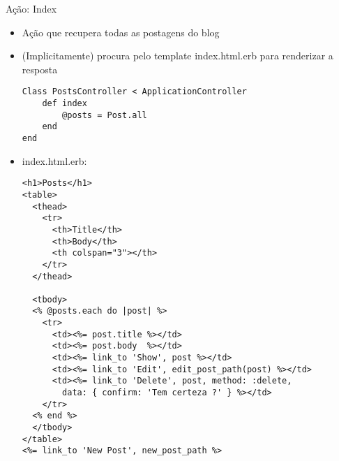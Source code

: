 \begin{frame}{Ação: Index}
	\begin{itemize}
		\item Ação que recupera \alert{todas as postagens} do blog
		\item (Implicitamente) procura pelo template \alert{index.html.erb} para renderizar a resposta
		\begin{lstlisting}[style=RubyInputStyle, caption=controllers/posts\_controller.rb]
Class PostsController < ApplicationController
	def index
		@posts = Post.all
	end
end 
		\end{lstlisting}		
		\framebreak
		\item \alert{index.html.erb}:
		\begin{lstlisting}[style=RubyInputStyle, caption=views/posts/index.html.erb]
<h1>Posts</h1>
<table>
  <thead>
    <tr>
      <th>Title</th>
      <th>Body</th>
      <th colspan="3"></th>
    </tr>
  </thead>

  <tbody>
  <% @posts.each do |post| %>
    <tr>
      <td><%= post.title %></td>
      <td><%= post.body  %></td>
      <td><%= link_to 'Show', post %></td>
      <td><%= link_to 'Edit', edit_post_path(post) %></td>
      <td><%= link_to 'Delete', post, method: :delete, 
        data: { confirm: 'Tem certeza ?' } %></td>
    </tr>
  <% end %>
  </tbody>
</table>	
<%= link_to 'New Post', new_post_path %>	
\end{lstlisting}
	\end{itemize}	
\end{frame}
